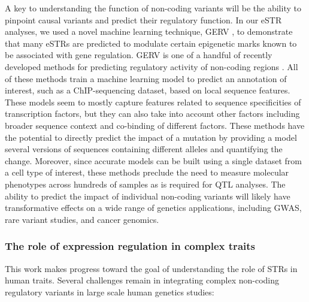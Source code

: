 A key to understanding the function of non-coding variants will be the ability to pinpoint causal variants and predict their regulatory function. In our eSTR analyses, we used a novel machine learning technique, GERV \cite{ZengHashimotoKangEtAl2015a}, to demonstrate that many eSTRs are predicted to modulate certain epigenetic marks known to be associated with gene regulation. GERV is one of a handful of recently developed methods for predicting regulatory activity of non-coding regions \cite{Kelley028399,Zhou:2015aa,Alipanahi:2015aa,Lee:2015aa}. All of these methods train a machine learning model to predict an annotation of interest, such as a ChIP-sequencing dataset, based on local sequence features. These models seem to mostly capture features related to sequence specificities of transcription factors, but they can also take into account other factors including broader sequence context and co-binding of different factors. These methods have the potential to directly predict the impact of a mutation by providing a model several versions of sequences containing different alleles and quantifying the change. Moreover, since accurate models can be built using a single dataset from a cell type of interest, these methods preclude the need to measure molecular phenotypes across hundreds of samples as is required for QTL analyses. The ability to predict the impact of individual non-coding variants will likely have transformative effects on a wide range of genetics applications, including GWAS, rare variant studies, and cancer genomics.

\subsubsection{The role of expression regulation in complex traits} 
This work makes progress toward the goal of understanding the role of STRs in human traits. Several challenges remain in integrating complex non-coding regulatory variants in large scale human genetics studies:


